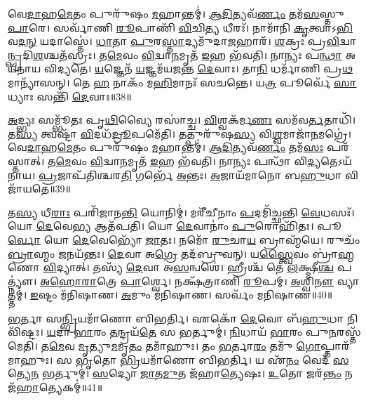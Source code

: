𑌵𑍇\-\ul{𑌦𑌾}\-𑌹\-\ul{𑌮𑍇}\-𑌤𑌂 𑌪𑍁𑌰𑍁᳴𑌷𑌂 \ul{𑌮}\-𑌹𑌾𑌨𑍍𑌤𑌮𑍍॑। 
\-\ul{𑌆}\-\-\ul{𑌦𑌿}\-𑌤𑍍𑌯𑌵᳴\-\ul{𑌰𑍍𑌣𑌂} 𑌤𑌮᳴\-\ul{𑌸}\-𑌸𑍍𑌤𑍁 \ul{𑌪𑌾}\-𑌰𑍇। 
𑌸𑌰𑍍𑌵𑌾᳴𑌣𑌿 \ul{𑌰𑍂}\-𑌪𑌾𑌣𑌿᳴ \ul{𑌵𑌿}\-𑌚𑌿\-\ul{𑌤𑍍𑌯} 𑌧𑍀𑌰𑌃᳴। 
𑌨𑌾𑌮𑌾᳴𑌨𑌿 \ul{𑌕𑍃}\-𑌤𑍍𑌵𑌾𑌽\-\ul{𑌭𑌿}\-𑌵\-\ul{𑌦}\-\-\ul{𑌨𑍍} 𑌯𑌦𑌾𑌸𑍍𑌤𑍇॑। 
\-\ul{𑌧𑌾}\-𑌤𑌾 \ul{𑌪𑍁}\-𑌰\-\ul{𑌸𑍍𑌤𑌾}\-𑌦𑍍𑌯𑌮𑍁᳴𑌦𑌾\-\ul{𑌜}\-𑌹𑌾𑌰᳴। 
\-\ul{𑌶}\-𑌕𑍍𑌰𑌃 𑌪𑍍𑌰\-\ul{𑌵𑌿}\-𑌦𑍍𑌵𑌾\-\ul{𑌨𑍍𑌪𑍍𑌰}\-𑌦𑌿\-\ul{𑌶}\-𑌶𑍍𑌚𑌤᳴𑌸𑍍𑌰𑌃। 
𑌤\-\ul{𑌮𑍇}\-𑌵𑌂 \ul{𑌵𑌿}\-𑌦𑍍𑌵𑌾\-\ul{𑌨}\-𑌮𑍃𑌤᳴ \ul{𑌇}\-𑌹 𑌭᳴𑌵𑌤𑌿। 
𑌨𑌾𑌨𑍍𑌯𑌃 𑌪\-\ul{𑌨𑍍𑌥𑌾} 𑌅𑌯᳴𑌨𑌾𑌯 𑌵𑌿𑌦𑍍𑌯𑌤𑍇। 
\-\ul{𑌯}\-𑌜𑍍𑌞𑍇𑌨᳴ \ul{𑌯}\-𑌜𑍍𑌞𑌮᳴𑌯𑌜𑌨𑍍𑌤 \ul{𑌦𑍇}\-𑌵𑌾𑌃। 
𑌤𑌾\-\ul{𑌨𑌿} 𑌧𑌰𑍍𑌮𑌾᳴𑌣𑌿 𑌪𑍍𑌰\-\ul{𑌥}\-𑌮𑌾𑌨𑍍𑌯𑌾᳴𑌸𑌨𑍍। 
𑌤𑍇 \ul{𑌹} 𑌨𑌾𑌕𑌂᳴ 𑌮\-\ul{𑌹𑌿}\-𑌮𑌾𑌨𑌃᳴ 𑌸𑌚𑌨𑍍𑌤𑍇। 
𑌯\-\ul{𑌤𑍍𑌰} 𑌪𑍂𑌰𑍍𑌵𑍇᳴ \ul{𑌸𑌾}\-𑌧𑍍𑌯𑌾𑌃 𑌸𑌨𑍍𑌤𑌿᳴ \ul{𑌦𑍇}\-𑌵𑌾𑌃॥38॥

\-\ul{𑌅}\-𑌦𑍍𑌭𑍍𑌯𑌃 𑌸𑌮𑍍𑌭𑍂᳴𑌤𑌃 𑌪𑍃\-\ul{𑌥𑌿}\-𑌵𑍍𑌯𑍈 𑌰𑌸𑌾॑𑌚𑍍𑌚। 
\-\ul{𑌵𑌿}\-𑌶𑍍𑌵𑌕᳴𑌰𑍍𑌮\-\ul{𑌣𑌃} 𑌸𑌮᳴𑌵\-\ul{𑌰𑍍𑌤}\-𑌤𑌾𑌧𑌿᳴। 
𑌤\-\ul{𑌸𑍍𑌯} 𑌤𑍍𑌵𑌷𑍍𑌟𑌾᳴ \ul{𑌵𑌿}\-𑌦𑌧᳴\-\ul{𑌦𑍍𑌰𑍂}\-𑌪𑌮𑍇᳴𑌤𑌿। 
𑌤𑌤𑍍𑌪𑍁𑌰𑍁᳴𑌷\-\ul{𑌸𑍍𑌯} 𑌵𑌿\-\ul{𑌶𑍍𑌵}\-𑌮𑌾𑌜𑌾᳴\-\ul{𑌨}\-𑌮𑌗𑍍𑌰𑍇॑। 
𑌵𑍇\-\ul{𑌦𑌾}\-𑌹\-\ul{𑌮𑍇}\-𑌤𑌂 𑌪𑍁𑌰𑍁᳴𑌷𑌂 \ul{𑌮}\-𑌹𑌾𑌨𑍍𑌤𑌮𑍍॑। 
\-\ul{𑌆}\-\-\ul{𑌦𑌿}\-𑌤𑍍𑌯𑌵᳴\-\ul{𑌰𑍍𑌣𑌂} 𑌤𑌮᳴\-\ul{𑌸𑌃} 𑌪𑌰᳴𑌸𑍍𑌤𑌾𑌤𑍍। 
𑌤\-\ul{𑌮𑍇}\-𑌵𑌂 \ul{𑌵𑌿}\-𑌦𑍍𑌵𑌾\-\ul{𑌨}\-𑌮𑍃𑌤᳴ \ul{𑌇}\-𑌹 𑌭᳴𑌵𑌤𑌿। 
𑌨𑌾𑌨𑍍𑌯𑌃 𑌪𑌨𑍍𑌥𑌾᳴ 𑌵𑌿\-\ul{𑌦𑍍𑌯}\-𑌤𑍇𑌽𑌯᳴𑌨𑌾𑌯। 
\-\ul{𑌪𑍍𑌰}\-𑌜𑌾𑌪᳴𑌤𑌿𑌶𑍍𑌚𑌰\-\ul{𑌤𑌿} 𑌗𑌰𑍍𑌭𑍇᳴ \ul{𑌅}\-𑌨𑍍𑌤𑌃। 
\-\ul{𑌅}\-𑌜𑌾𑌯᳴𑌮𑌾𑌨𑍋 𑌬\-\ul{𑌹𑍁}\-𑌧𑌾 𑌵𑌿𑌜𑌾᳴𑌯𑌤𑍇॥39॥

𑌤\-\ul{𑌸𑍍𑌯} 𑌧𑍀\-\ul{𑌰𑌾𑌃} 𑌪𑌰𑌿᳴𑌜𑌾𑌨\-\ul{𑌨𑍍𑌤𑌿} 𑌯𑍋𑌨𑌿𑌮𑍍॑। 
𑌮𑌰𑍀᳴𑌚𑍀𑌨𑌾𑌂 \ul{𑌪}\-𑌦𑌮𑌿᳴𑌚𑍍𑌛𑌨𑍍𑌤𑌿 \ul{𑌵𑍇}\-𑌧𑌸𑌃᳴। 
𑌯𑍋 \ul{𑌦𑍇}\-𑌵𑍇\-\ul{𑌭𑍍𑌯} 𑌆𑌤᳴𑌪𑌤𑌿। 
𑌯𑍋 \ul{𑌦𑍇}\-𑌵𑌾𑌨𑌾𑌂॑ \ul{𑌪𑍁}\-𑌰𑍋𑌹𑌿᳴𑌤𑌃। 
𑌪𑍂\-\ul{𑌰𑍍𑌵𑍋} 𑌯𑍋 \ul{𑌦𑍇}\-𑌵𑍇𑌭𑍍𑌯𑍋᳴ \ul{𑌜𑌾}\-𑌤𑌃। 
𑌨𑌮𑍋᳴ \ul{𑌰𑍁}\-𑌚𑌾\-\ul{𑌯} 𑌬𑍍𑌰𑌾𑌹𑍍𑌮᳴𑌯𑍇। 
𑌰𑍁𑌚𑌂᳴ \ul{𑌬𑍍𑌰𑌾}\-𑌹𑍍𑌮𑌂 \ul{𑌜}\-𑌨𑌯᳴𑌨𑍍𑌤𑌃। 
\-\ul{𑌦𑍇}\-𑌵𑌾 𑌅\-\ul{𑌗𑍍𑌰𑍇} 𑌤𑌦᳴𑌬𑍍𑌰𑍁𑌵𑌨𑍍। 
𑌯\-\ul{𑌸𑍍𑌤𑍍𑌵𑍈}\-𑌵𑌂 𑌬𑍍𑌰𑌾॑\-\ul{𑌹𑍍𑌮}\-𑌣𑍋 \ul{𑌵𑌿}\-𑌦𑍍𑌯𑌾𑌤𑍍। 
𑌤𑌸𑍍𑌯᳴ \ul{𑌦𑍇}\-𑌵𑌾 𑌅\-\ul{𑌸}\-𑌨𑍍𑌵𑌶𑍇॑। 
𑌹𑍍𑌰𑍀𑌶𑍍𑌚᳴ 𑌤𑍇 \ul{𑌲}\-𑌕𑍍𑌷𑍍𑌮𑍀\-\ul{𑌶𑍍𑌚} 𑌪𑌤𑍍𑌨𑍍𑌯𑍗॑। 
\-\ul{𑌅}\-\-\ul{𑌹𑍋}\-\-\ul{𑌰𑌾}\-𑌤𑍍𑌰𑍇 \ul{𑌪𑌾}\-𑌰𑍍𑌶𑍍𑌵𑍇। 
𑌨𑌕𑍍𑌷᳴𑌤𑍍𑌰𑌾𑌣𑌿 \ul{𑌰𑍂}\-𑌪𑌮𑍍। 
\-\ul{𑌅}\-𑌶𑍍𑌵𑌿\-\ul{𑌨𑍗} 𑌵𑍍𑌯𑌾𑌤𑍍𑌤𑌮𑍍॑। 
\-\ul{𑌇}\-𑌷𑍍𑌟𑌂 𑌮᳴𑌨𑌿𑌷𑌾𑌣। 
\-\ul{𑌅}\-𑌮𑍁𑌂 𑌮᳴𑌨𑌿𑌷𑌾𑌣। 
𑌸𑌰𑍍𑌵𑌂᳴ 𑌮𑌨𑌿𑌷𑌾𑌣॥40॥
\anuvakamend[\-\ul{𑌜𑌾}\-\-\ul{𑌯}\-\-\ul{𑌤𑍇} 𑌵𑌶𑍇᳴ \ul{𑌸}\-𑌪𑍍𑌤 𑌚᳴]

\-\ul{𑌭}\-𑌰𑍍𑌤𑌾 𑌸\-\ul{𑌨𑍍𑌭𑍍𑌰𑌿}\-𑌯𑌮𑌾᳴𑌣𑍋 𑌬𑌿𑌭𑌰𑍍𑌤𑌿। 
𑌏𑌕𑍋᳴ \ul{𑌦𑍇}\-𑌵𑍋 𑌬᳴\-\ul{𑌹𑍁}\-𑌧𑌾 𑌨𑌿𑌵𑌿᳴𑌷𑍍𑌟𑌃। 
\-\ul{𑌯}\-𑌦𑌾 \ul{𑌭𑌾}\-𑌰𑌂 \ul{𑌤}\-𑌨𑍍𑌦𑍍𑌰𑌯᳴\-\ul{𑌤𑍇} 𑌸 𑌭𑌰𑍍𑌤𑍁𑌮𑍍॑। 
\-\ul{𑌨𑌿}\-𑌧𑌾𑌯᳴ \ul{𑌭𑌾}\-𑌰𑌂 𑌪𑍁\-\ul{𑌨}\-𑌰𑌸𑍍𑌤᳴𑌮𑍇𑌤𑌿। 
𑌤\-\ul{𑌮𑍇}\-𑌵 \ul{𑌮𑍃}\-𑌤𑍍𑌯𑍁\-\ul{𑌮}\-𑌮𑍃\-\ul{𑌤𑌂} 𑌤𑌮𑌾᳴𑌹𑍁𑌃। 
𑌤𑌂 \ul{𑌭}\-𑌰𑍍𑌤𑌾\-\ul{𑌰𑌂} 𑌤𑌮𑍁᳴ \ul{𑌗𑍋}\-𑌪𑍍𑌤𑌾𑌰᳴𑌮𑌾𑌹𑍁𑌃। 
𑌸 \ul{𑌭𑍃}\-𑌤𑍋 \ul{𑌭𑍍𑌰𑌿}\-𑌯𑌮𑌾᳴𑌣𑍋 𑌬𑌿𑌭𑌰𑍍𑌤𑌿। 
𑌯 𑌏᳴\-\ul{𑌨𑌂} 𑌵𑍇𑌦᳴ \ul{𑌸}\-𑌤𑍍𑌯𑍇\-\ul{𑌨} 𑌭𑌰𑍍𑌤𑍁𑌮𑍍॑। 
\-\ul{𑌸}\-𑌦𑍍𑌯𑍋 \ul{𑌜𑌾}\-𑌤\-\ul{𑌮𑍁}\-𑌤 𑌜᳴𑌹𑌾\-\ul{𑌤𑍍𑌯𑍇}\-𑌷𑌃। 
\-\ul{𑌉}\-𑌤𑍋 𑌜𑌰᳴\-\ul{𑌨𑍍𑌤𑌂} 𑌨 𑌜᳴\-\ul{𑌹𑌾}\-𑌤𑍍𑌯𑍇𑌕𑌮𑍍॑॥41॥


